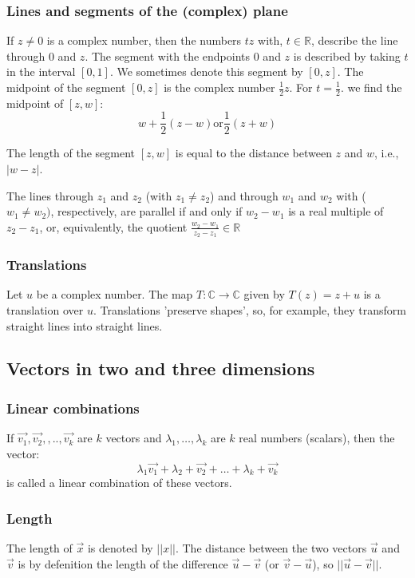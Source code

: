 \documentclass{article}
\begin{document}
			\subsubsection{Lines and segments of the (complex) plane}
			If $z \neq 0$ is a complex number, then the numbers $tz$ with, $t \in \mathbb{R}$, describe the line through $0$ and $z$. The segment with the endpoints $0$ and $z$ is described by taking $t$ in the interval $[0,1]$. We sometimes denote this segment by $[0,z]$. The midpoint of the segment $[0,z]$ is the complex number $\frac{1}{2}z$. For $t = \frac{1}{2}$. we find the midpoint of $[z,w]$:
			\begin{equation*}
				w + \frac{1}{2}(z-w) \text{or} \frac{1}{2}(z+w)
			\end{equation*}
			
			The length of the segment $[z,w]$ is equal to the distance between $z$ and $w$, i.e., $|w-z|$.
			
			The lines through $z_1$ and $z_2$ (with $z_1 \neq z_2$) and through $w_1$ and $w_2$ with ($w_1 \neq w_2)$, respectively, are parallel if and only if $w_2 - w_1$ is a real multiple of $z_2-z_1$, or, equivalently, the quotient $\frac{w_2-w_1}{z_2-z_1} \in \mathbb{R}$
			
			\subsubsection{Translations}
			Let $u$ be a complex number. The map $T: \mathbb{C} \to \mathbb{C}$ given by $T(z) = z+u$ is a translation over $u$. Translations 'preserve shapes', so, for example, they transform straight lines into straight lines.

		\subsection{Vectors in two and three dimensions}
			\subsubsection{Linear combinations}
			If $\vec{v_1},\vec{v_2},,..,\vec{v_k}$ are $k$ vectors and $\lambda_1,\dots,\lambda_k$ are $k$ real numbers (scalars), then the vector:
			\begin{equation*}
				\lambda_1\vec{v_1} + \lambda_2+\vec{v_2} + \dots + \lambda_k+\vec{v_k}
			\end{equation*}
			is called a linear combination of these vectors.
			
			\subsubsection{Length}
			The length of $\vec{x}$ is denoted by $||x||$. The distance between the two vectors $\vec{u}$ and $\vec{v}$ is by defenition the length of the difference $\vec{u}- \vec{v}$ (or $\vec{v} - \vec{u}$), so $||\vec{u} - \vec{v}||$.
			
\end{document}
